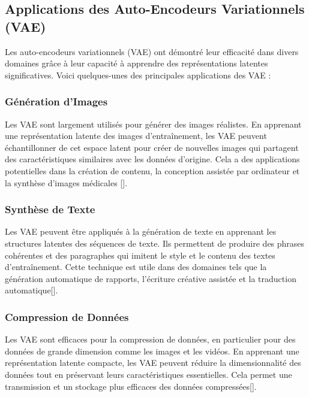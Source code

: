 \subsection{Applications des Auto-Encodeurs Variationnels (VAE)}

Les auto-encodeurs variationnels (VAE) ont démontré leur efficacité dans divers
domaines grâce à leur capacité à apprendre des représentations latentes
significatives. Voici quelques-unes des principales applications des VAE :

\subsubsection{Génération d'Images}

Les VAE sont largement utilisés pour générer des images réalistes. En apprenant
une représentation latente des images d'entraînement, les VAE peuvent
échantillonner de cet espace latent pour créer de nouvelles images qui
partagent des caractéristiques similaires avec les données d'origine. Cela a
des applications potentielles dans la création de contenu, la conception
assistée par ordinateur et la synthèse d'images médicales [\cite{luhman2024highfidelity}].

\subsubsection{Synthèse de Texte}

Les VAE peuvent être appliqués à la génération de texte en apprenant les
structures latentes des séquences de texte. Ils permettent de produire des
phrases cohérentes et des paragraphes qui imitent le style et le contenu des
textes d'entraînement. Cette technique est utile dans des domaines tels que la
génération automatique de rapports, l'écriture créative assistée et la
traduction automatique[\cite{wang2019topic}].

\subsubsection{Compression de Données}

Les VAE sont efficaces pour la compression de données, en particulier pour des
données de grande dimension comme les images et les vidéos. En apprenant une
représentation latente compacte, les VAE peuvent réduire la dimensionnalité des
données tout en préservant leurs caractéristiques essentielles. Cela permet une
transmission et un stockage plus efficaces des données compressées[\cite{yilmaz2021selfvae}].

